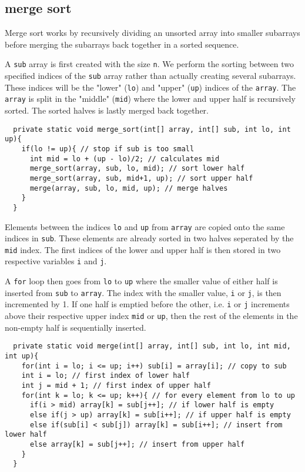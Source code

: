 \documentclass[a4paper,11pt]{article}
\begin{document}
\subsection*{merge sort}

Merge sort works by recursively dividing an unsorted array into smaller 
subarrays before merging the subarrays back together in a sorted sequence.

A {\tt sub} array is first created with the size {\tt n}. We perform the 
sorting between two specified indices of the {\tt sub} array rather than 
actually creating several subarrays. These indices will be the "lower" 
({\tt lo}) and "upper" ({\tt up}) indices of the {\tt array}. The 
{\tt array} is split in the "middle" ({\tt mid}) where the lower and upper 
half is recursively sorted. The sorted halves is lastly merged back 
together.

\begin{verbatim}
  private static void merge_sort(int[] array, int[] sub, int lo, int up){
    if(lo != up){ // stop if sub is too small
      int mid = lo + (up - lo)/2; // calculates mid
      merge_sort(array, sub, lo, mid); // sort lower half
      merge_sort(array, sub, mid+1, up); // sort upper half
      merge(array, sub, lo, mid, up); // merge halves
    }
  }
\end{verbatim}

Elements between the indices {\tt lo} and {\tt up} from {\tt array} are 
copied onto the same indices in {\tt sub}. These elements are already
sorted in two halves seperated by the {\tt mid} index. The first indices 
of the lower and upper half is then stored in two respective variables 
{\tt i} and {\tt j}. 

A {\tt for} loop then goes from {\tt lo} to {\tt up} where the smaller 
value of either half is inserted from {\tt sub} to {\tt array}. The index 
with the smaller value, {\tt i} or {\tt j}, is then incremented by 1. If 
one half is emptied before the other, i.e. {\tt i} or {\tt j} increments 
above their respective upper index {\tt mid} or {\tt up}, then the rest 
of the elements in the non-empty half is sequentially inserted.

\begin{verbatim}
  private static void merge(int[] array, int[] sub, int lo, int mid, int up){
    for(int i = lo; i <= up; i++) sub[i] = array[i]; // copy to sub
    int i = lo; // first index of lower half
    int j = mid + 1; // first index of upper half
    for(int k = lo; k <= up; k++){ // for every element from lo to up
      if(i > mid) array[k] = sub[j++]; // if lower half is empty
      else if(j > up) array[k] = sub[i++]; // if upper half is empty
      else if(sub[i] < sub[j]) array[k] = sub[i++]; // insert from lower half
      else array[k] = sub[j++]; // insert from upper half
    }
  }
\end{verbatim}
\end{document}
